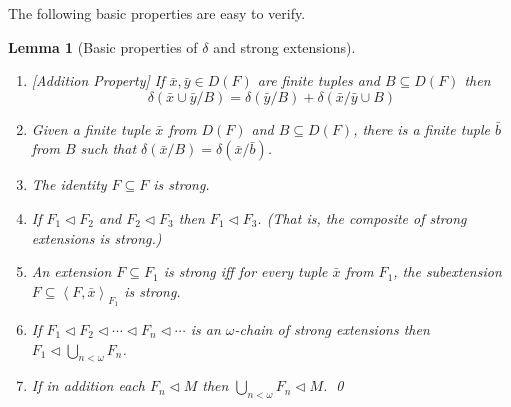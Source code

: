 \documentclass[12pt]{amsart}
\newtheorem{lemma}[prop]{Lemma}
\theoremstyle{definition}
\begin{document}
The following basic properties are easy to verify.
\begin{lemma}[Basic properties of $\delta$ and strong extensions]\label{strong lemma} \ 
   \begin{enumerate}
  \item{} [Addition Property] If ${{\ensuremath{\bar{x}}}}, {{\ensuremath{\bar{y}}}} \in D(F)$ are finite tuples and $B {\subseteq} D(F)$ then
\[\delta({{\ensuremath{\bar{x}}}}\cup {{\ensuremath{\bar{y}}}}/B) = \delta({{\ensuremath{\bar{y}}}}/B) + \delta({{\ensuremath{\bar{x}}}}/{{\ensuremath{\bar{y}}}} \cup B)\]
\item Given a finite tuple ${{\ensuremath{\bar{x}}}}$ from $D(F)$ and $B {\subseteq} D(F)$, there is a finite tuple ${{\ensuremath{\bar{b}}}}$ from $B$ such that $\delta({{\ensuremath{\bar{x}}}}/B) = \delta({{\ensuremath{\bar{x}}}}/{{\ensuremath{\bar{b}}}})$.
  \item The identity $F {\subseteq} F$ is strong.
  \item  If $F_1 {\ensuremath{\lhd}} F_2$ and $F_2 {\ensuremath{\lhd}} F_3$ then $F_1 {\ensuremath{\lhd}}
    F_3$. (That is, the composite of strong extensions is strong.)
  \item An extension $F {\subseteq} F_1$ is strong iff for every tuple ${{\ensuremath{\bar{x}}}}$ from $F_1$, the subextension $F {\subseteq} {\ensuremath{\left\langle {F,{{\ensuremath{\bar{x}}}}} \right\rangle}}_{F_1}$ is strong. 
  \item If $F_1 {\ensuremath{\lhd}} F_2 {\ensuremath{\lhd}} \cdots {\ensuremath{\lhd}} F_n {\ensuremath{\lhd}} \cdots$ is an $\omega$-chain of strong extensions then $F_1 {\ensuremath{\lhd}} \bigcup_{n < \omega} F_n$.
\item If in addition each $F_n {\ensuremath{\lhd}} M$ then $  \bigcup_{n < \omega} F_n {\ensuremath{\lhd}} M$.  \qed
  \end{enumerate}
\end{lemma}
\end{document}
